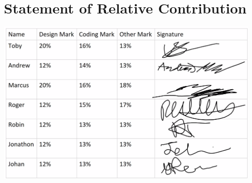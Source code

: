 \documentclass[12pt, twoside, a4paper]{report}
\begin{document}
\chapter*{Statement of Relative Contribution}
\includegraphics[width=15cm]{StateOfCont.png}
\end{document}
